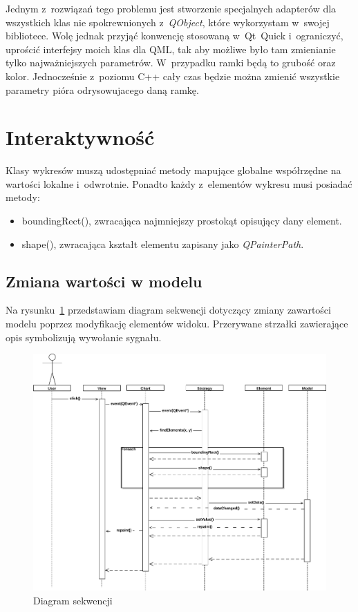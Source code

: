 Jednym z~rozwiązań tego problemu jest stworzenie specjalnych adapterów dla wszystkich klas nie spokrewnionych z~\textit{QObject}, które wykorzystam w~swojej bibliotece. Wolę jednak przyjąć konwencję stosowaną w~Qt~Quick i~ograniczyć, uprościć interfejsy moich klas dla QML, tak aby możliwe było tam zmienianie tylko najważniejszych parametrów. W~przypadku ramki będą to grubość oraz kolor. Jednocześnie z~poziomu C++ cały czas będzie można zmienić wszystkie parametry pióra odrysowujacego daną ramkę.

\section{Interaktywność}
Klasy wykresów muszą udostępniać metody mapujące globalne współrzędne na wartości lokalne i~odwrotnie. Ponadto każdy z~elementów wykresu musi posiadać metody:
\begin{itemize}
\item{boundingRect(), zwracająca najmniejszy prostokąt opisujący dany element.}
\item{shape(), zwracająca kształt elementu zapisany jako \textit{QPainterPath}.}
\end{itemize}

\subsection{Zmiana wartości w modelu}
Na rysunku~\ref{rys:seq:inter} przedstawiam diagram sekwencji dotyczący zmiany zawartości modelu poprzez modyfikację elementów widoku. Przerywane strzałki zawierające opis symbolizują wywołanie sygnału.

\begin{figure}
\centering
\caption{Diagram sekwencji}\label{rys:seq:inter}
\includegraphics[scale=0.6]{img/seq_inter.pdf}
\end{figure}

